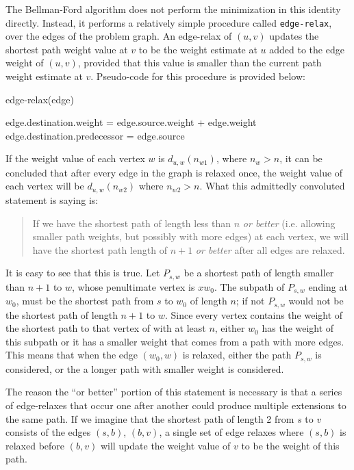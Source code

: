 \documentclass[12pt,twoside]{reedthesis}
\newcommand{\procedure}[1]{{\tt#1}}
\begin{document}
The Bellman-Ford algorithm does not perform the minimization in this identity directly. Instead, it performs a relatively simple procedure called \procedure{edge-relax}, over the edges of the problem graph. An edge-relax of $(u,v)$ updates the shortest path weight value at $v$ to be the weight estimate at $u$ added to the edge weight of $(u,v)$, provided that this value is smaller than the current path weight estimate at $v$. Pseudo-code for this procedure is provided below:

\begin{algorithm}[h!]
\caption{edge-relax(edge)}
\label{edgerelax}
\begin{algorithmic}
\STATE edge.destination.weight = edge.source.weight + edge.weight
\STATE edge.destination.predecessor = edge.source
\ENDIF
\end{algorithmic}
\end{algorithm}

\vspace{1pc}

If the weight value of each vertex $w$ is $d_{u,w}(n_{w1})$, where $n_w > n$, it can be concluded that after every edge in the graph is relaxed once, the weight value of each vertex will be $d_{u,w}(n_{w2})$ where $n_{w2} > n$. What this admittedly convoluted statement is saying is:

\begin{quote}
If we have the shortest path of length less than $n$ {\em or better} (i.e. allowing smaller path weights, but possibly with more edges) at each vertex, we will have the shortest path length of $n+1$  {\em or better} after all edges are relaxed.
\end{quote}

It is easy to see that this is true. Let $P_{s,w}$ be a shortest path of length smaller than $n+1$ to $w$, whose penultimate vertex is $xw_{0}$. The subpath of $P_{s,w}$ ending at $w_{0}$, must be the shortest path from $s$ to $w_0$ of length $n$; if not $P_{s,w}$ would not be the shortest path of length $n+1$ to $w$. Since every vertex contains the weight of the shortest path to that vertex of with at least $n$, either $w_{0}$ has the weight of this subpath or it has a smaller weight that comes from a path with more edges. This means that when the edge $(w_0, w)$ is relaxed, either the path $P_{s,w}$ is considered, or the a longer path with smaller weight is considered.

The reason the ``or better'' portion of this statement is necessary is that a series of edge-relaxes that occur one after another could produce multiple extensions to the same path. If we imagine that the shortest path of length 2 from $s$ to $v$ consists of the edges $(s,b)$, $(b,v)$, a single set of edge relaxes where $(s,b)$ is relaxed before $(b,v)$ will update the weight value of $v$ to be the weight of this path.
\vspace{1pc}
\end{document}

